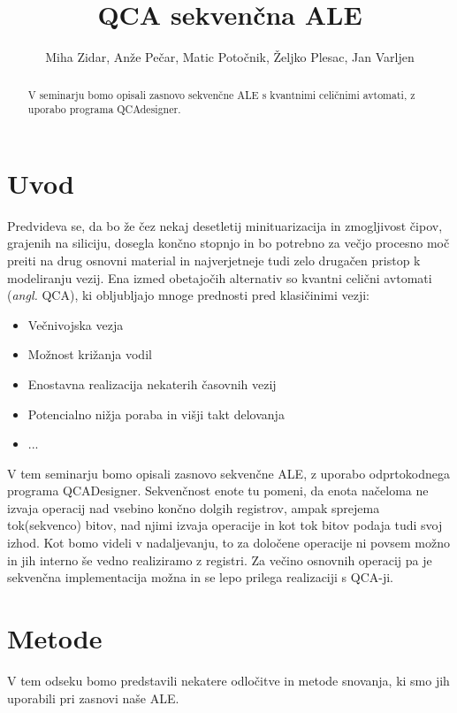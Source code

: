 \documentclass[seminar, slovene]{FRIreport}
\newcommand{\angl}[1]{(\textit{angl.} #1)}
\begin{document}
\title{QCA sekven\v cna ALE}

\author{Miha Zidar, Anže Pečar, Matic Potočnik, Željko Plesac, Jan Varljen}


\begin{abstract}
V seminarju bomo opisali zasnovo sekvenčne ALE s kvantnimi celičnimi avtomati, z uporabo programa QCAdesigner.

\end{abstract}

%
\section{Uvod}
Predvideva se, da bo že čez nekaj desetletij minituarizacija in zmogljivost čipov, grajenih na siliciju, dosegla končno stopnjo in bo potrebno za večjo procesno moč preiti na drug osnovni material in najverjetneje tudi zelo drugačen pristop k modeliranju vezij. Ena izmed obetajočih alternativ so kvantni celični avtomati \angl{QCA}, ki obljubljajo mnoge prednosti pred klasičinimi vezji:
\begin{itemize}
\item Večnivojska vezja
\item Možnost križanja vodil
\item Enostavna realizacija nekaterih časovnih vezij
\item Potencialno nižja poraba in višji takt delovanja
\item ...
\end{itemize}
V tem seminarju bomo opisali zasnovo sekvenčne ALE, z uporabo odprtokodnega programa QCADesigner\cite{walus:2004}. Sekvenčnost enote tu pomeni, da enota načeloma ne izvaja operacij nad vsebino končno dolgih registrov, ampak sprejema tok(sekvenco) bitov, nad njimi izvaja operacije in kot tok bitov podaja tudi svoj izhod. Kot bomo videli v nadaljevanju, to za določene operacije ni povsem možno in jih interno še vedno realiziramo z registri. Za večino osnovnih operacij pa je sekvenčna implementacija možna in se lepo prilega realizaciji s QCA-ji.

%
\section{Metode}
V tem odseku bomo predstavili nekatere odločitve in metode snovanja, ki smo jih uporabili pri zasnovi naše ALE.
\end{document}

